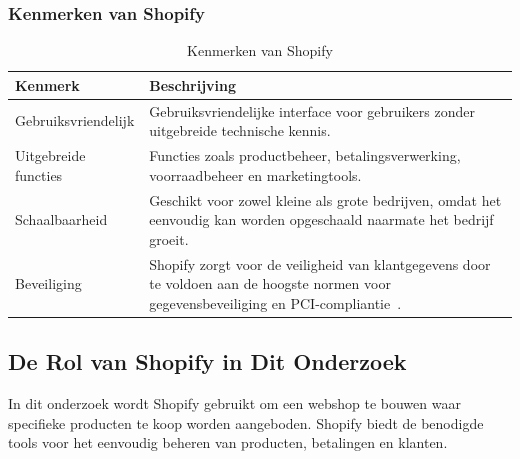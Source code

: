 \subsubsection{Kenmerken van Shopify}
\begin{table}[h]
    \centering
    \begin{tabular}{|l|p{10cm}|} %
        \hline
        \textbf{Kenmerk}            & \textbf{Beschrijving}                                                                                                                                            \\ \hline
        Gebruiksvriendelijk         & Gebruiksvriendelijke interface voor gebruikers zonder uitgebreide technische kennis.            \\ \hline
        Uitgebreide functies        & Functies zoals productbeheer, betalingsverwerking, voorraadbeheer en marketingtools.                                                \\ \hline
        Schaalbaarheid              & Geschikt voor zowel kleine als grote bedrijven, omdat het eenvoudig kan worden opgeschaald naarmate het bedrijf groeit.                                   \\ \hline
        Beveiliging                 & Shopify zorgt voor de veiligheid van klantgegevens door te voldoen aan de hoogste normen voor gegevensbeveiliging en PCI-compliantie~\autocite{bang2024}.              \\ \hline
    \end{tabular}
    \caption{Kenmerken van Shopify}
    \label{tab:shopify_features}
\end{table}

\newpage

\subsection{De Rol van Shopify in Dit Onderzoek}

In dit onderzoek wordt Shopify gebruikt om een webshop te bouwen waar specifieke producten te koop worden aangeboden. Shopify biedt de benodigde tools voor het eenvoudig beheren van producten, betalingen en klanten.

